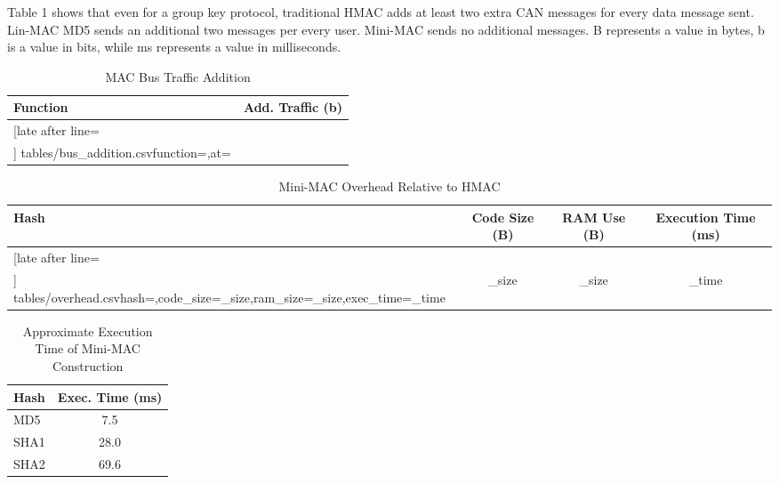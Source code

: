 Table 1 shows that even for a group key protocol, traditional HMAC adds at least two extra CAN messages for every data message sent. Lin-MAC MD5 sends an additional two messages per every user. Mini-MAC sends no additional messages. B represents a value in bytes, b is a value in bits, while ms represents a value in milliseconds.
	
	\begin{table}
	\centering
	\caption{MAC Bus Traffic Addition}
	\vspace{8pt}
	\begin{tabular}{|l|c|}\hline%
	\bfseries Function & \bfseries Add. Traffic (b) \\\hline \csvreader[late after line=\\]%
		{tables/bus_addition.csv}{function=\function,at=\at}%
		{\function & \at}%
		\hline
	\end{tabular}
	\end{table}

	\begin{table}	
	\centering	
	\caption{Mini-MAC Overhead Relative to HMAC}
	\vspace{8pt}
	\begin{tabular}{|l|c|c|c|}\hline%
	\bfseries Hash & \bfseries Code Size (B) & \bfseries RAM Use (B) & \bfseries Execution Time (ms)\\\hline \csvreader[late after line=\\]%
		{tables/overhead.csv}{hash=\hash,code_size=\code_size,ram_size=\ram_size,exec_time=\exec_time}%
		{\hash & \code_size & \ram_size & \exec_time}%
		\hline
	\end{tabular}
	\end{table}
	
	\begin{table}
	\centering
	\caption{Approximate Execution Time of Mini-MAC Construction}
	\vspace{8pt}
	\begin{tabular}{| @{}l | S[table-format=2.1] | @{}}
		\hline 
		\hspace{2pt}\textbf{Hash} & {\textbf{Exec. Time (ms)}} \\
		\hline 
		\hspace{2pt}MD5 & 7.5 \\
		\hspace{2pt}SHA1 & 28.0 \\
		\hspace{2pt}SHA2 & 69.6 \\ 
		\hline
	\end{tabular}	
	\end{table}
	
